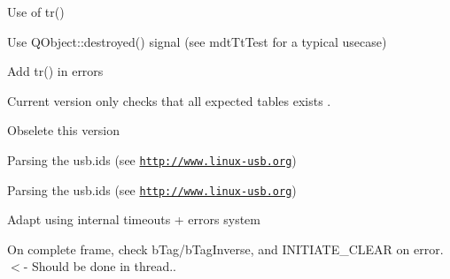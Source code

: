 \begin{DoxyRefList}
\begin{DoxyItemize}
\item Use of tr()
\item Use Q\-Object\-::destroyed() signal (see mdt\-Tt\-Test for a typical usecase)  
\end{DoxyItemize}
\item[\label{todo__todo000050}%
\hypertarget{todo__todo000050}{}%
Member \hyperlink{classmdt_tt_base_a6dbd221d1518e30c3692a7ba54b57c03}{mdt\-Tt\-Base\-:\-:mdt\-Tt\-Base} (\hyperlink{class_q_object}{Q\-Object} $\ast$parent, Q\-Sql\-Database db)]Add tr() in errors  
\item[\label{todo__todo000052}%
\hypertarget{todo__todo000052}{}%
Member \hyperlink{classmdt_tt_database_schema_ace92b340a68ce07ad477502a68de4514}{mdt\-Tt\-Database\-Schema\-:\-:check\-Schema} ()]Current version only checks that all expected tables exists . 
\item[\label{todo__todo000073}%
\hypertarget{todo__todo000073}{}%
Member \hyperlink{classmdt_tt_test_connection_cable_a0fcfed15264ef80fbb9e566aaf0df4e5}{mdt\-Tt\-Test\-Connection\-Cable\-:\-:add\-Link} (const Q\-Variant \&test\-Connection\-Id, const Q\-Variant \&dut\-Connection\-Id, const Q\-Variant \&test\-Cable\-Id, const Q\-Variant \&identification, const Q\-Variant \&value)]Obselete this version  
\item[\label{todo__todo000031}%
\hypertarget{todo__todo000031}{}%
Member \hyperlink{classmdt_usb_device_descriptor_a626afc71d8e72600f12259ac6f5a5866}{mdt\-Usb\-Device\-Descriptor\-:\-:product\-Name} () const ]Parsing the usb.\-ids (see \href{http://www.linux-usb.org}{\tt http\-://www.\-linux-\/usb.\-org})  
\item[\label{todo__todo000030}%
\hypertarget{todo__todo000030}{}%
Member \hyperlink{classmdt_usb_device_descriptor_ac2f746ebd5540b65bf00f82c991f5c3b}{mdt\-Usb\-Device\-Descriptor\-:\-:vendor\-Name} () const ]Parsing the usb.\-ids (see \href{http://www.linux-usb.org}{\tt http\-://www.\-linux-\/usb.\-org})  
\item[\label{todo__todo000032}%
\hypertarget{todo__todo000032}{}%
Member \hyperlink{classmdt_usb_port_manager_a34bf0ac118e586bf2547a98964a2230c}{mdt\-Usb\-Port\-Manager\-:\-:wait\-Readen\-Control\-Response} ()]Adapt using internal timeouts + errors system  
\item[\label{todo__todo000034}%
\hypertarget{todo__todo000034}{}%
Member \hyperlink{classmdt_usbtmc_port_manager_aca42b343ae1f6a324e6e45968f03bbea}{mdt\-Usbtmc\-Port\-Manager\-:\-:from\-Thread\-New\-Frame\-Readen} ()]On complete frame, check b\-Tag/b\-Tag\-Inverse, and I\-N\-I\-T\-I\-A\-T\-E\-\_\-\-C\-L\-E\-A\-R on error. $<$-\/ Should be done in thread..  

\end{DoxyRefList}
